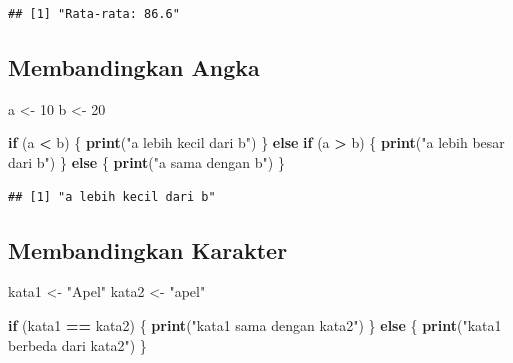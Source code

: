 \documentclass[
]{book}
\newenvironment{Shaded}{\begin{snugshade}}{\end{snugshade}}
\newcommand{\ControlFlowTok}[1]{\textcolor[rgb]{0.13,0.29,0.53}{\textbf{#1}}}
\newcommand{\DecValTok}[1]{\textcolor[rgb]{0.00,0.00,0.81}{#1}}
\newcommand{\FunctionTok}[1]{\textcolor[rgb]{0.13,0.29,0.53}{\textbf{#1}}}
\newcommand{\NormalTok}[1]{#1}
\newcommand{\OtherTok}[1]{\textcolor[rgb]{0.56,0.35,0.01}{#1}}
\newcommand{\SpecialCharTok}[1]{\textcolor[rgb]{0.81,0.36,0.00}{\textbf{#1}}}
\newcommand{\StringTok}[1]{\textcolor[rgb]{0.31,0.60,0.02}{#1}}
\begin{document}
\begin{verbatim}
## [1] "Rata-rata: 86.6"
\end{verbatim}

\hypertarget{membandingkan-angka}{%
\subsection{Membandingkan Angka}\label{membandingkan-angka}}

\begin{Shaded}
\begin{Highlighting}[]
\NormalTok{a }\OtherTok{\textless{}{-}} \DecValTok{10}
\NormalTok{b }\OtherTok{\textless{}{-}} \DecValTok{20}

\ControlFlowTok{if}\NormalTok{ (a }\SpecialCharTok{\textless{}}\NormalTok{ b) \{}
  \FunctionTok{print}\NormalTok{(}\StringTok{"a lebih kecil dari b"}\NormalTok{)}
\NormalTok{\} }\ControlFlowTok{else} \ControlFlowTok{if}\NormalTok{ (a }\SpecialCharTok{\textgreater{}}\NormalTok{ b) \{}
  \FunctionTok{print}\NormalTok{(}\StringTok{"a lebih besar dari b"}\NormalTok{)}
\NormalTok{\} }\ControlFlowTok{else}\NormalTok{ \{}
  \FunctionTok{print}\NormalTok{(}\StringTok{"a sama dengan b"}\NormalTok{)}
\NormalTok{\}}
\end{Highlighting}
\end{Shaded}

\begin{verbatim}
## [1] "a lebih kecil dari b"
\end{verbatim}

\hypertarget{membandingkan-karakter}{%
\subsection{Membandingkan Karakter}\label{membandingkan-karakter}}

\begin{Shaded}
\begin{Highlighting}[]
\NormalTok{kata1 }\OtherTok{\textless{}{-}} \StringTok{"Apel"}
\NormalTok{kata2 }\OtherTok{\textless{}{-}} \StringTok{"apel"}

\ControlFlowTok{if}\NormalTok{ (kata1 }\SpecialCharTok{==}\NormalTok{ kata2) \{}
  \FunctionTok{print}\NormalTok{(}\StringTok{"kata1 sama dengan kata2"}\NormalTok{)}
\NormalTok{\} }\ControlFlowTok{else}\NormalTok{ \{}
  \FunctionTok{print}\NormalTok{(}\StringTok{"kata1 berbeda dari kata2"}\NormalTok{)}
\NormalTok{\}}
\end{Highlighting}
\end{Shaded}
\end{document}
